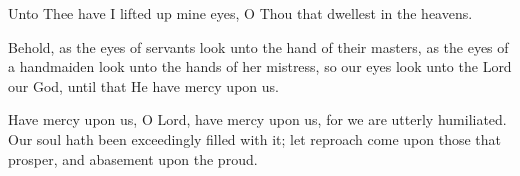 Unto Thee have I lifted up mine eyes, O Thou that dwellest in the heavens.

Behold, as the eyes of servants look unto the hand of their masters, as the eyes of a handmaiden look unto the hands of her mistress, so our eyes look unto the Lord our God, until that He have mercy upon us.

Have mercy upon us, O Lord, have mercy upon us, for we are utterly humiliated. Our soul hath been exceedingly filled with it; let reproach come upon those that prosper, and abasement upon the proud.
